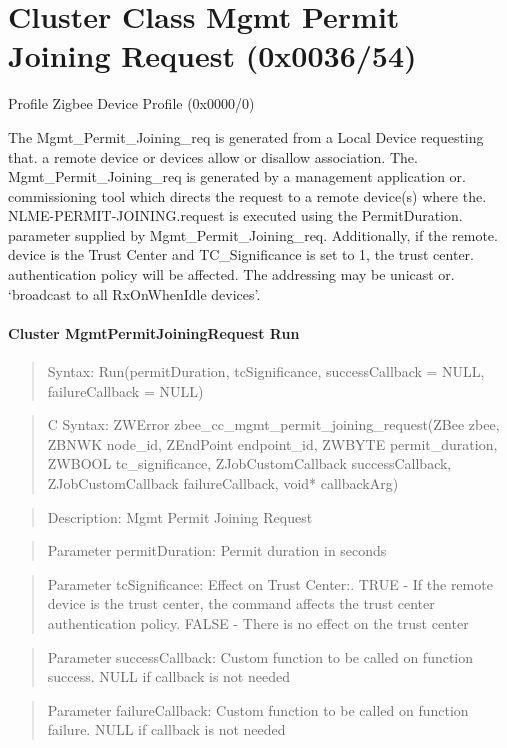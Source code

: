 \section{Cluster Class Mgmt Permit Joining Request (0x0036/54)}

Profile Zigbee Device Profile (0x0000/0)

The Mgmt\_Permit\_Joining\_req is generated from a Local Device requesting that. a remote device or devices allow or disallow association. The. Mgmt\_Permit\_Joining\_req is generated by a management application or. commissioning tool which directs the request to a remote device(s) where the. NLME-PERMIT-JOINING.request is executed using the PermitDuration. parameter supplied by Mgmt\_Permit\_Joining\_req. Additionally, if the remote. device is the Trust Center and TC\_Significance is set to 1, the trust center. authentication policy will be affected. The addressing may be unicast or. ‘broadcast to all RxOnWhenIdle devices’.
\paragraph{Cluster MgmtPermitJoiningRequest Run}
\begin{quote}Syntax: Run(permitDuration, tcSignificance, successCallback = NULL, failureCallback = NULL)\end{quote}
\begin{quote}C Syntax: ZWError zbee\_cc\_mgmt\_permit\_joining\_request(ZBee zbee, ZBNWK node\_id, ZEndPoint endpoint\_id, ZWBYTE permit\_duration, ZWBOOL tc\_significance, ZJobCustomCallback successCallback, ZJobCustomCallback failureCallback, void* callbackArg)\end{quote}
\begin{quote}Description: Mgmt Permit Joining Request\end{quote}
\begin{quote}Parameter permitDuration: Permit duration in seconds\end{quote}
\begin{quote}Parameter tcSignificance: Effect on Trust Center:. TRUE  - If the remote device is the trust center, the command affects the trust center authentication policy. FALSE - There is no effect on the trust center\end{quote}
\begin{quote}Parameter successCallback: Custom function to be called on function success. NULL if callback is not needed\end{quote}
\begin{quote}Parameter failureCallback: Custom function to be called on function failure. NULL if callback is not needed\end{quote}



